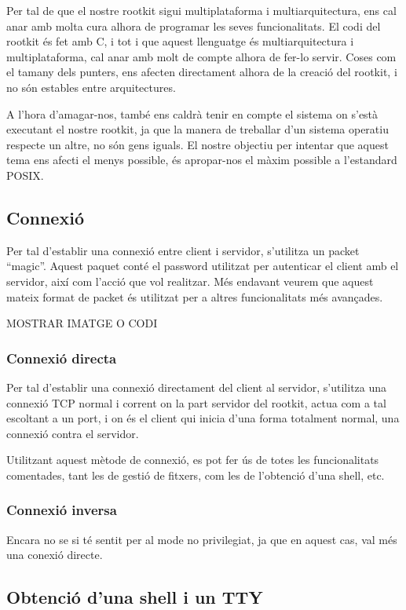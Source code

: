 Per tal de que el nostre rootkit sigui multiplataforma i multiarquitectura, ens cal anar amb molta cura alhora de programar les 
seves funcionalitats. El codi del rootkit és fet amb C, i tot i que aquest llenguatge és multiarquitectura i multiplataforma, cal 
anar amb molt de compte alhora de fer-lo servir. Coses com el tamany dels punters, ens afecten directament alhora de la creació
del rootkit, i no són estables entre arquitectures.

A l'hora d'amagar-nos, també ens caldrà tenir en compte el sistema on s'està executant el nostre rootkit, ja que la manera de treballar
d'un sistema operatiu respecte un altre, no són gens iguals. El nostre objectiu per intentar que aquest tema ens afecti el menys possible,
és apropar-nos el màxim possible a l'estandard POSIX.

\subsection{Connexió}

Per tal d'establir una connexió entre client i servidor, s'utilitza un packet ``magic''. Aquest paquet conté el password utilitzat per 
autenticar el client amb el servidor, així com l'acció que vol realitzar. Més endavant veurem que aquest mateix format de packet és 
utilitzat per a altres funcionalitats més avançades.

MOSTRAR IMATGE O CODI

\subsubsection{Connexió directa}
Per tal d'establir una connexió directament del client al servidor, s'utilitza una connexió TCP normal i corrent on la part servidor del
rootkit, actua com a tal escoltant a un port, i on és el client qui inicia d'una forma totalment normal, una connexió contra el servidor.

Utilitzant aquest mètode de connexió, es pot fer ús de totes les funcionalitats comentades, tant les de gestió de fitxers, com les de l'obtenció
d'una shell, etc.

\subsubsection{Connexió inversa}
Encara no se si té sentit per al mode no privilegiat, ja que en aquest cas, val més una conexió directe.


\subsection{Obtenció d'una shell i un TTY}

